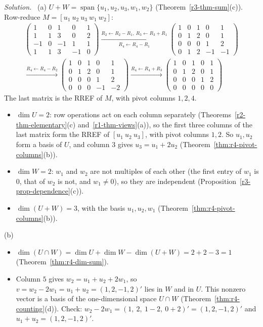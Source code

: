 \documentclass[12pt]{article}
\DeclareMathOperator{\Span}{span}
\theoremstyle{definition}
\newenvironment{solution}{\par\noindent\textit{Solution.}\ }{\par\smallskip}
\begin{document}
\begin{solution}
(a) \(U+W=\Span\{u_1,u_2,u_3,w_1,w_2\}\) (Theorem~\ref{r3-thm-sum}(c)). Row-reduce \(M=[u_1\ u_2\ u_3\ w_1\ w_2]\):
\[
\begin{gathered}
\begin{pmatrix}1&0&1&0&1\\1&1&3&0&2\\-1&0&-1&1&1\\1&1&3&-1&0\end{pmatrix}
\xrightarrow[R_4\leftarrow R_4-R_1]{R_2\leftarrow R_2-R_1,\ R_3\leftarrow R_3+R_1}
\begin{pmatrix}1&0&1&0&1\\0&1&2&0&1\\0&0&0&1&2\\0&1&2&-1&-1\end{pmatrix}
\\
\xrightarrow{R_4\leftarrow R_4-R_2}
\begin{pmatrix}1&0&1&0&1\\0&1&2&0&1\\0&0&0&1&2\\0&0&0&-1&-2\end{pmatrix}
\xrightarrow{R_4\leftarrow R_4+R_3}
\begin{pmatrix}1&0&1&0&1\\0&1&2&0&1\\0&0&0&1&2\\0&0&0&0&0\end{pmatrix}
\end{gathered}
\]
The last matrix is the RREF of \(M\), with pivot columns \(1,2,4\).
\begin{itemize}
\item \(\dim U=2\): row operations act on each column separately (Theorems~\ref{r2-thm-elementary}(c)
and~\ref{r1-thm-views}(a)), so the first three columns of the last matrix form the RREF of \([u_1\ u_2\ u_3]\), with pivot
columns \(1,2\). So \(u_1,u_2\) form a basis of \(U\), and column \(3\) gives \(u_3=u_1+2u_2\)
(Theorem~\ref{thm:r4-pivot-columns}(b)).
\item \(\dim W=2\): \(w_1\) and \(w_2\) are not multiples of each other (the first entry of \(w_1\) is \(0\), that of
\(w_2\) is not, and \(w_1\ne0\)), so they are independent (Proposition~\ref{r3-prop-dependence}(c)).
\item \(\dim(U+W)=3\), with the basis \(u_1,u_2,w_1\) (Theorem~\ref{thm:r4-pivot-columns}(b)).
\end{itemize}
(b)
\begin{itemize}
\item \(\dim(U\cap W)=\dim U+\dim W-\dim(U+W)=2+2-3=1\) (Theorem~\ref{thm:r4-dim-sum}).
\item Column \(5\) gives \(w_2=u_1+u_2+2w_1\), so \(v=w_2-2w_1=u_1+u_2=(1,2,-1,2)'\) lies in \(W\) and in \(U\). This
nonzero vector is a basis of the one-dimensional space \(U\cap W\) (Theorem~\ref{thm:r4-counting}(d)). Check:
\(w_2-2w_1=(1,\ 2,\ 1-2,\ 0+2)'=(1,2,-1,2)'\) and \(u_1+u_2=(1,2,-1,2)'\).
\end{itemize}
\end{solution}
\end{document}
